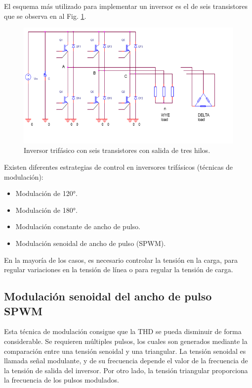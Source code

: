 \documentclass[11pt, a4paper]{article}
\begin{document}
El esquema más utilizado para implementar un inversor es el de seis transistores que se observa en al Fig. \ref{fig:inversor}.
\begin{figure}[h]
	\centering
	\includegraphics[width=15cm]{Imagen/inversor}
	\caption{Inversor trifásico con seis transistores con salida de tres hilos.}
	\label{fig:inversor}
\end{figure} 
 
Existen diferentes estrategias de control en inversores trifásicos (técnicas de modulación):
\begin{itemize}
	\item Modulación de 120°.
	\item Modulación de 180°.
	\item Modulación constante de ancho de pulso.
	\item Modulación senoidal de ancho de pulso (SPWM).
\end{itemize}

En la mayoría de los casos, es necesario controlar la tensión en la carga, para regular variaciones en la tensión de línea o para regular la tensión de carga.

\subsection{Modulación senoidal del ancho de pulso SPWM}
Esta técnica de modulación consigue que la THD se pueda disminuir de forma considerable. Se requieren múltiples pulsos, los cuales son generados mediante la comparación entre una tensión senoidal y una triangular. La tensión senoidal es llamada señal modulante, y de su frecuencia depende el valor de la frecuencia de la tensión de salida del inversor. Por otro lado, la tensión triangular proporciona la frecuencia de los pulsos modulados.
\end{document}
